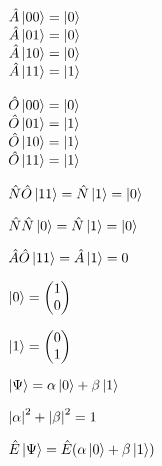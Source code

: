 \documentclass[multi=math, crop, convert]{standalone}
\begin{document}
\begin{math}
	\begin{matrix}
		\hat{A}\ket{00} = \ket{0}\\
		\hat{A}\ket{01} = \ket{0}\\
		\hat{A}\ket{10} = \ket{0}\\
		\hat{A}\ket{11} = \ket{1}
	\end{matrix}
\end{math}

\begin{math}
	\begin{matrix}
		\hat{O}\ket{00} = \ket{0}\\
		\hat{O}\ket{01} = \ket{1}\\
		\hat{O}\ket{10} = \ket{1}\\
		\hat{O}\ket{11} = \ket{1}
	\end{matrix}
\end{math}

\begin{math}
\hat{N}\hat{O}\ket{11} = \hat{N}\ket{1} = \ket{0}
\end{math}

\begin{math}
	\hat{N}\hat{N}\ket{0} = \hat{N}\ket{1} = \ket{0}
\end{math}

\begin{math}
\hat{A}\hat{O}\ket{11} = \hat{A}\ket{1} = 0
\end{math}

\begin{math}
\ket{0} = \begin{pmatrix}
	1 \\
	0
\end{pmatrix}
\end{math}

\begin{math}
\ket{1} = \begin{pmatrix}
	0 \\
	1
\end{pmatrix}
\end{math}

\begin{math}
	\ket{\Psi} = \alpha\ket{0} + \beta\ket{1} 
\end{math}

\begin{math}
	\abs{\alpha}^2 + \abs{\beta}^2 = 1
\end{math}

\begin{math}
	\hat{E}\ket{\Psi} = \hat{E}(\alpha\ket{0} + \beta\ket{1})
\end{math}
\end{document}

